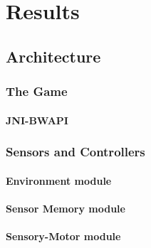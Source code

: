 
\chapter{Results}

\section{Architecture}
\label{sec:architecture}

\subsection{The Game}
\subsubsection{JNI-BWAPI}
\subsection{Sensors and Controllers}
\subsubsection{Environment module}
\subsubsection{Sensor Memory module}
\subsubsection{Sensory-Motor module}
